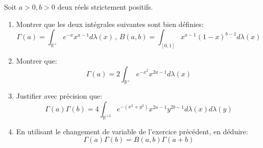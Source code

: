 \documentclass[a4paper, 12pt]{amsart}
\begin{document}
\begin{fex}
Soit $a>0, b>0$ deux réels strictement positifs. 
\begin{enumerate}
  \item Montrer que les deux intégrales
suivantes sont bien définies:
\[
\Gamma(a) = \int_{\mathbb{R}^+} e^{-x}x^{a-1} d\lambda(x) \, , \, B(a,b) =
\int_{[0,1]} x^{a-1}(1-x)^{b-1} d \lambda(x)
\]
\item Montrer que:
\[
\Gamma(a) = 2 \int_{\mathbb{R}^+} e^{-x^2} x^{2a-1} d \lambda(x)
\]
\item Justifier avec précision que:
\[
\Gamma(a)\Gamma(b) = 4 \int_{\mathbb{R}^{+2}}
e^{-(x^2+y^2)}x^{2a-1}y^{2b-1}d\lambda(x) d\lambda(y)
\]
\item En utilisant le changement de variable de l'exercice précédent, en
déduire:
\[
\Gamma(a)\Gamma(b)=B(a,b)\Gamma(a+b)
\]
\end{enumerate}
\end{fex}
\end{document}
